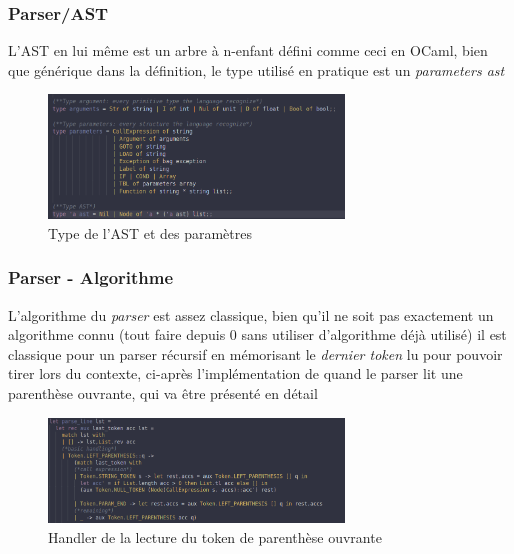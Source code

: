 \documentclass{beamer}
\begin{document}
    \begin{frame}
        \frametitle{Parser/AST}

        L'AST en lui même est un arbre à n-enfant défini comme ceci en OCaml, bien que générique dans la définition, 
        le type utilisé en pratique est un \textit{parameters ast} 
        \begin{figure}[H]
            \center
            \includegraphics[width=0.7\textwidth]{img/type.png}
            \caption{Type de l'AST et des paramètres}
        \end{figure}
    \end{frame}

    \begin{frame}
        \frametitle{Parser - Algorithme}
        L'algorithme du \textit{parser} est assez classique, bien qu'il ne soit pas exactement un algorithme connu (tout faire depuis
        0 sans utiliser d'algorithme déjà utilisé) il est classique pour un parser récursif en mémorisant le \textit{dernier token} lu
        pour pouvoir tirer lors du contexte, ci-après l'implémentation de quand le parser lit une parenthèse ouvrante, qui va être présenté en détail
        \begin{figure}[H]
            \center
            \includegraphics[width=0.7\textwidth]{img/parenth.png}
            \caption{Handler de la lecture du token de parenthèse ouvrante}
        \end{figure}
    \end{frame}
\end{document}
